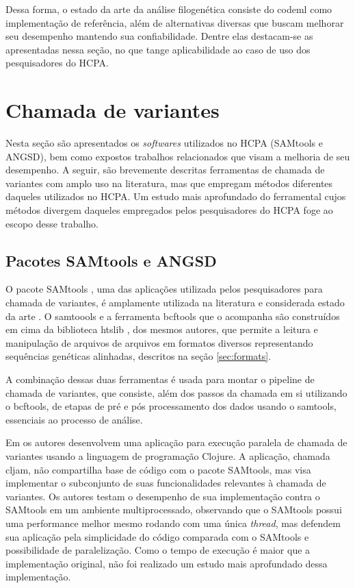 \documentclass[cic,tc]{iiufrgs}
\begin{document}
Dessa forma, o estado da arte da análise filogenética consiste do codeml como
implementação de referência, além de alternativas diversas que buscam melhorar
seu desempenho mantendo sua confiabilidade. Dentre elas destacam-se as
apresentadas nessa seção, no que tange aplicabilidade ao caso de uso dos
pesquisadores do HCPA.

\section{Chamada de variantes}
\label{sec:callant}

Nesta seção são apresentados os \textit{softwares} utilizados no HCPA (SAMtools
e ANGSD), bem como expostos trabalhos relacionados que visam a melhoria de seu
desempenho. A seguir, são brevemente descritas ferramentas de chamada de
variantes com amplo uso na literatura, mas que empregam métodos diferentes
daqueles utilizados no HCPA. Um estudo mais aprofundado do ferramental cujos
métodos divergem daqueles empregados pelos pesquisadores do HCPA foge ao escopo
desse trabalho.

\subsection{Pacotes SAMtools e ANGSD}

O pacote SAMtools \cite{li2009sequence}, uma das aplicações utilizada pelos
pesquisadores para chamada de variantes, é amplamente utilizada na literatura
\cite{danecek2021twelve} e considerada estado da arte \cite{yao2020evaluation}.
O samtoools e a ferramenta bcftools que o acompanha são construídos em cima da
biblioteca htslib \cite{bonfield2021htslib}, dos mesmos autores, que permite a
leitura e manipulação de arquivos de arquivos em formatos diversos
representando sequências genéticas alinhadas, descritos na seção
\ref{sec:formats}.

A combinação dessas duas ferramentas é usada para montar o pipeline de chamada
de variantes, que consiste, além dos passos da chamada em si utilizando o
bcftools, de etapas de pré e pós processamento dos dados usando o samtools,
essenciais ao processo de análise.

Em \cite{takeuchi2016cljam} os autores desenvolvem uma aplicação para execução
paralela de chamada de variantes usando a linguagem de programação Clojure. A
aplicação, chamada cljam, não compartilha base de código com o pacote SAMtools,
mas visa implementar o subconjunto de suas funcionalidades relevantes à
chamada de variantes. Os autores testam o desempenho de sua implementação
contra o SAMtools em um ambiente multiprocessado, observando que o SAMtools
possui uma performance melhor mesmo rodando com uma única \textit{thread}, mas defendem
sua aplicação pela simplicidade do código comparada com o SAMtools e
possibilidade de paralelização. Como o tempo de execução é maior que a
implementação original, não foi realizado um estudo mais aprofundado dessa
implementação.
\end{document}
